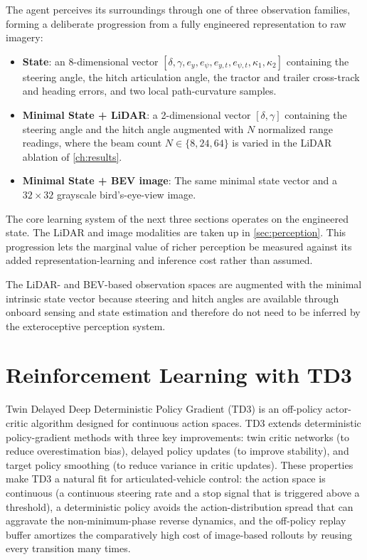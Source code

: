 The agent perceives its surroundings through one of three observation families, forming a deliberate progression from a fully engineered representation to raw imagery:
\begin{itemize}
    \item \textbf{State}: an 8-dimensional vector $[\delta,\gamma,e_y,e_\psi,e_{y,t},e_{\psi,t},\kappa_1,\kappa_2]$ containing the steering angle, the hitch articulation angle, the tractor and trailer cross-track and heading errors, and two local path-curvature samples.
    \item \textbf{Minimal State + LiDAR}: a 2-dimensional vector $[\delta,\gamma]$  containing the steering angle and the hitch angle augmented with $N$ normalized range readings, where the beam count $N \in \{8,24,64\}$ is varied in the LiDAR ablation of \cref{ch:results}.
    \item \textbf{Minimal State + BEV image}: The same minimal state vector and a $32 \times 32$ grayscale bird's-eye-view image.
\end{itemize}
The core learning system of the next three sections operates on the engineered state. The LiDAR and image modalities are taken up in \cref{sec:perception}. This progression lets the marginal value of richer perception be measured against its added representation-learning and inference cost rather than assumed.

The LiDAR- and BEV-based observation spaces are augmented with the minimal intrinsic state vector because steering and hitch angles are available through onboard sensing and state estimation and therefore do not need to be inferred by the exteroceptive perception system. 

\section{Reinforcement Learning with TD3}

Twin Delayed Deep Deterministic Policy Gradient (TD3) is an off-policy actor-critic algorithm designed for continuous action spaces. TD3 extends deterministic policy-gradient methods with three key improvements: twin critic networks (to reduce overestimation bias), delayed policy updates (to improve stability), and target policy smoothing (to reduce variance in critic updates). These properties make TD3 a natural fit for articulated-vehicle control: the action space is continuous (a continuous steering rate and a stop signal that is triggered above a threshold), a deterministic policy avoids the action-distribution spread that can aggravate the non-minimum-phase reverse dynamics, and the off-policy replay buffer amortizes the comparatively high cost of image-based rollouts by reusing every transition many times.

